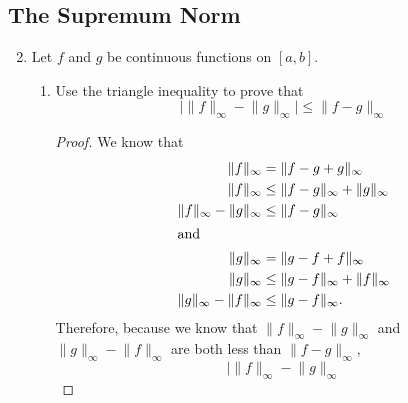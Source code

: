 \documentclass{article}
\begin{document}
\subsection{The Supremum Norm}
\begin{enumerate}
      \setcounter{enumi}{1}
      \item Let $f$ and $g$ be continuous functions on $[a,b]$.
            \begin{enumerate}
                  \item Use the triangle inequality to prove that
                        \[
                              \lvert
                              \lVert f\rVert_\infty - \lVert g\rVert_\infty
                              \rvert \leq \lVert f-g\rVert_\infty
                        \]
                        \begin{proof}
                              We know that
                              \begin{align*}
                                    \lVert f\rVert_\infty                         & = \lVert f-g+g\rVert_\infty                          \\
                                    \lVert f\rVert_\infty                         & \leq \lVert f-g\rVert_\infty + \lVert g\rVert_\infty \\
                                    \lVert f\rVert_\infty - \lVert g\rVert_\infty & \leq \lVert f-g\rVert_\infty                         \\
                                    \intertext{and}
                                    \lVert g\rVert_\infty                         & = \lVert g-f+f\rVert_\infty                          \\
                                    \lVert g\rVert_\infty                         & \leq \lVert g-f\rVert_\infty + \lVert f\rVert_\infty \\
                                    \lVert g\rVert_\infty - \lVert f\rVert_\infty & \leq \lVert g-f\rVert_\infty.                        \\
                              \end{align*}
                              Therefore, because we know that $\lVert f\rVert_\infty - \lVert g\rVert_\infty$
                              and $\lVert g\rVert_\infty - \lVert f\rVert_\infty$ are both less than $\lVert f-g\rVert_\infty$,
                              \[
                                    \lvert
                                    \lVert f\rVert_\infty - \lVert g\rVert_\infty
\]
\end{proof}
\end{enumerate}
\end{enumerate}
\end{document}
